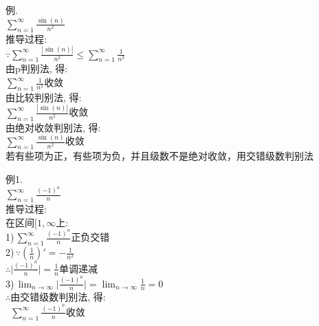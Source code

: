 例.\\
$\displaystyle\sum_{n=1}^{\infty}\frac{\sin(n)}{n^2}$\\[1ex]
推导过程:\\
$\displaystyle\because\sum_{n=1}^{\infty}\frac{|\sin(n)|}{n^2}\leqslant\sum_{n=1}^{\infty}\frac{1}{n^2}$\\
由p判别法, 得:\\
$\displaystyle\sum_{n=1}^\infty\frac{1}{n^2}$收敛\\
由比较判别法, 得:\\
$\displaystyle\sum_{n=1}^{\infty}\frac{|\sin(n)|}{n^2}$收敛\\
由绝对收敛判别法, 得:\\
$\displaystyle\sum_{n=1}^{\infty}\frac{\sin(n)}{n^2}$收敛\\[2ex]

若有些项为正，有些项为负，并且级数不是绝对收敛，用交错级数判别法
{\par\centering
{}
\par}

例1.\\
\phantom{例}$\displaystyle\sum_{n=1}^{\infty}\frac{(-1)^n}{n}$\\[1ex]
推导过程:\\
在区间$[1,\infty$上:\\
1)\,$\displaystyle\sum_{n=1}^{\infty}\frac{(-1)^n}{n}$正负交错\\
2)\,$\displaystyle\because(\frac{1}{n})'=-\frac{1}{n^2}$\\
\phantom{2)\,}$\displaystyle\therefore\Big|\frac{(-1)^n}{n}\Big|=\frac{1}{n}$单调递减\\
3)\,$\displaystyle\lim_{n\to\infty}\Big|\frac{(-1)^n}{n}\Big|=\lim_{n\to\infty}\frac{1}{n}=0$\\
$\therefore$由交错级数判别法, 得:\\
$\phantom{\therefore}\displaystyle\sum_{n=1}^{\infty}\frac{(-1)^n}{n}$收敛\\[1ex]

